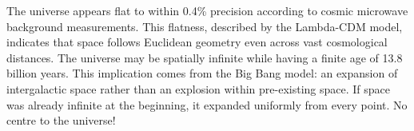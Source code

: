The universe appears flat to within 0.4\% precision according to cosmic microwave background measurements. This flatness, described by the Lambda-CDM model, indicates that space follows Euclidean geometry even across vast cosmological distances. The universe may be spatially infinite while having a finite age of 13.8 billion years. This implication comes from the Big Bang model: an expansion of intergalactic space rather than an explosion within pre-existing space. If space was already infinite at the beginning, it expanded uniformly from every point. No centre to the universe!
